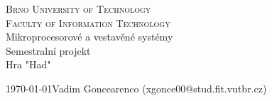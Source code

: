 \documentclass[a4paper, 11pt]{article}
\begin{document}
\begin{center}
    \Huge
    \textsc{Brno University of Technology\\\huge Faculty of Information Technology}\\
    \LARGE
    Mikroprocesorové a vestavěné systémy\\\LARGE 
    Semestralní projekt\\\Huge
    \Huge Hra "Had"\\
\end{center}
{\Large \today \hfill Vadim Goncearenco (xgonce00@stud.fit.vutbr.cz)}
\newpage

\tableofcontents
\newpage



\newcommand{\todo}[1]{\textcolor{orange}{\textbf{[[#1]]}}}
\newcommand{\desc}[1]{\textcolor{gray}{\textbf{[[#1]]}}}
\end{document}
